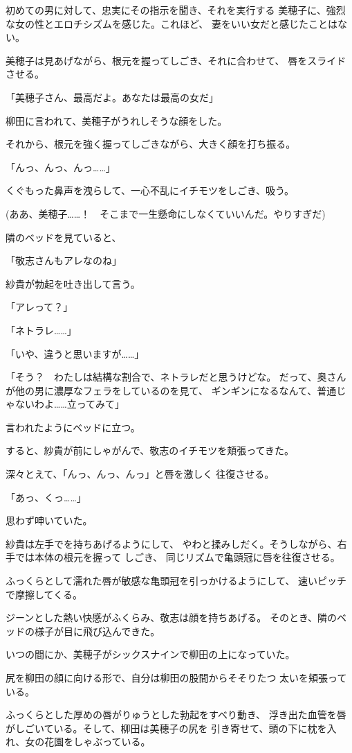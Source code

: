 ﻿\documentclass[
    book,tate,
    line_length=30zw,
    jafontsize=12pt,
    paper=b5j,
    landscape,
    ]{jlreq}
\begin{document}
初めての男に対して、忠実にその指示を聞き、それを実行する
美穂子に、強烈な女の性とエロチシズムを感じた。これほど、
妻をいい女だと感じたことはない。

美穂子は見あげながら、根元を握ってしごき、それに合わせて、
唇をスライドさせる。

「美穂子さん、最高だよ。あなたは最高の女だ」

柳田に言われて、美穂子がうれしそうな顔をした。

それから、根元を強く握ってしごきながら、大きく顔を打ち振る。

「んっ、んっ、んっ……」

くぐもった鼻声を洩らして、一心不乱にイチモツをしごき、吸う。

(ああ、美穂子……！　そこまで一生懸命にしなくていいんだ。やりすぎだ)

隣のベッドを見ていると、

「敬志さんもアレなのね」

紗貴が勃起を吐き出して言う。

「アレって？」

「ネトラレ……」

「いや、違うと思いますが……」

「そう？　わたしは結構な割合で、ネトラレだと思うけどな。
だって、奥さんが他の男に濃厚なフェラをしているのを見て、
ギンギンになるなんて、普通じゃないわよ……立ってみて」

言われたようにベッドに立つ。

すると、紗貴が前にしゃがんで、敬志のイチモツを頬張ってきた。

深々とえて、「んっ、んっ、んっ」と唇を激しく
往復させる。

「あっ、くっ……」

思わず呻いていた。

紗貴は左手でを持ちあげるようにして、
やわと揉みしだく。そうしながら、右手では本体の根元を握って
しごき、 同じリズムで亀頭冠に唇を往復させる。

ふっくらとして濡れた唇が敏感な亀頭冠を引っかけるようにして、
速いピッチで摩擦してくる。

ジーンとした熱い快感がふくらみ、敬志は顔を持ちあげる。
そのとき、隣のベッドの様子が目に飛び込んできた。

いつの間にか、美穂子がシックスナインで柳田の上になっていた。

尻を柳田の顔に向ける形で、自分は柳田の股間からそそりたつ
太いを頬張っている。

ふっくらとした厚めの唇がりゅうとした勃起をすべり動き、
浮き出た血管を唇がしごいている。そして、柳田は美穂子の尻を
引き寄せて、頭の下に枕を入れ、女の花園をしゃぶっている。
\end{document}
